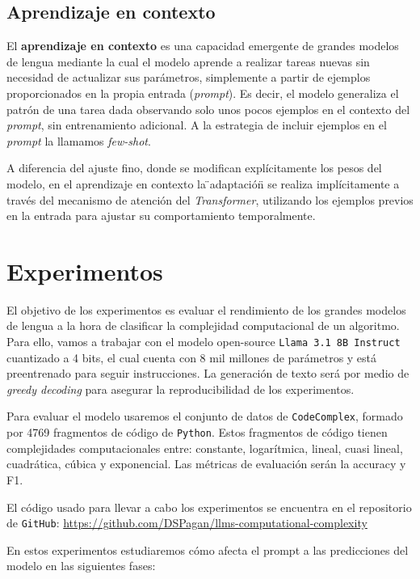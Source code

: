 \documentclass[12pt,twoside]{article}
\begin{document}
\subsection{Aprendizaje en contexto}
El \textbf{aprendizaje en contexto} \cite{in-context learning} es una capacidad emergente de grandes modelos de lengua mediante la cual el modelo aprende a realizar tareas nuevas sin necesidad de actualizar sus parámetros, simplemente a partir de ejemplos proporcionados en la propia entrada (\textit{prompt}). Es decir, el modelo generaliza el patrón de una tarea dada observando solo unos pocos ejemplos en el contexto del \textit{prompt}, sin entrenamiento adicional. A la estrategia de incluir ejemplos en el \textit{prompt} la llamamos \textit{few-shot}.

A diferencia del ajuste fino, donde se modifican explícitamente los pesos del modelo, en el aprendizaje en contexto la \"{}adaptación\"{} se realiza implícitamente a través del mecanismo de atención del \textit{Transformer}, utilizando los ejemplos previos en la entrada para ajustar su comportamiento temporalmente.

\section{Experimentos}
El objetivo de los experimentos es evaluar el rendimiento de los grandes modelos de lengua a la hora de clasificar la complejidad computacional de un algoritmo. Para ello, vamos a trabajar con el modelo open-source \texttt{Llama 3.1 8B Instruct} cuantizado a 4 bits, el cual cuenta con 8 mil millones de parámetros y está preentrenado para seguir instrucciones. La generación de texto será por medio de \textit{greedy decoding} para asegurar la reproducibilidad de los experimentos.

Para evaluar el modelo usaremos el conjunto de datos de \texttt{CodeComplex}, formado por 4769 fragmentos de código de \texttt{Python}. Estos fragmentos de código tienen complejidades computacionales entre: constante, logarítmica, lineal, cuasi lineal, cuadrática, cúbica y exponencial. Las métricas de evaluación serán la accuracy y F1.

El código usado para llevar a cabo los experimentos se encuentra en el repositorio de \texttt{GitHub}: \url{https://github.com/DSPagan/llms-computational-complexity}

En estos experimentos estudiaremos cómo afecta el prompt a las predicciones del modelo en las siguientes fases:
\end{document}
